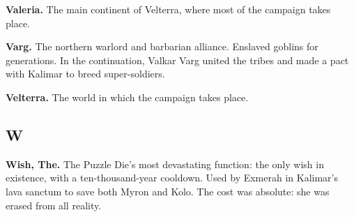 \noindent
\textbf{Valeria.} The main continent of Velterra, where most of the campaign takes place.

\smallskip \noindent
\textbf{Varg.} The northern warlord and barbarian alliance. Enslaved goblins for generations. In the continuation, Valkar Varg united the tribes and made a pact with Kalimar to breed super-soldiers.

\smallskip \noindent
\textbf{Velterra.} The world in which the campaign takes place.

\subsection*{W}

\noindent
\textbf{Wish, The.} The Puzzle Die's most devastating function: the only wish in existence, with a ten-thousand-year cooldown. Used by Exmerah in Kalimar's lava sanctum to save both Myron and Kolo. The cost was absolute: she was erased from all reality.

\clearpage
